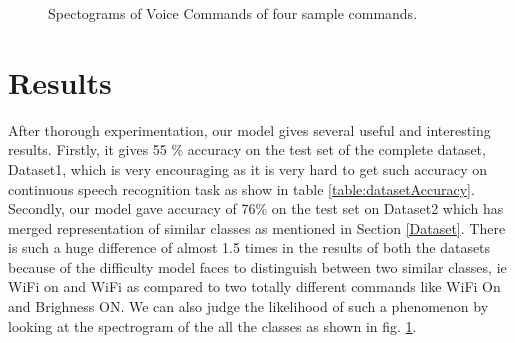 \documentclass[conference]{IEEEtran}
\begin{document}
\begin{figure}[h!]
\caption{Spectograms of Voice Commands of four sample commands.}
\label{table:spectograms}
\centering
{}
\newline
{}
\end{figure}


\section{Results}\label{Results}
After thorough experimentation, our model gives several useful and interesting results. Firstly, it gives 55 \% accuracy on the test set of the complete dataset, Dataset1, which is very encouraging as it is very hard to get such accuracy on continuous speech recognition task as show in table \ref{table:datasetAccuracy}. Secondly, our model gave accuracy of 76\% on the test set on Dataset2 which has merged representation of similar classes as mentioned in Section \ref{Dataset}. There is such a huge difference of almost 1.5 times in the results of both the datasets because of the difficulty model faces to distinguish between two similar classes, ie WiFi on and WiFi as compared to two totally different commands like WiFi On and Brighness ON. We can also judge the likelihood of such a phenomenon by looking at the spectrogram of the all the classes as shown in fig.
 \ref{table:spectograms}. 
\end{document}
